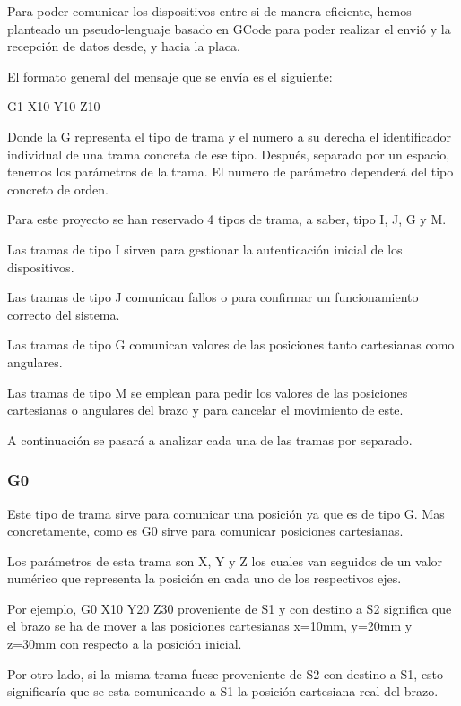 Para poder comunicar los dispositivos entre si de manera eficiente, hemos planteado un pseudo-lenguaje basado en GCode para poder realizar el envió y la recepción de datos desde, y hacia la placa.

El formato general del mensaje que se envía es el siguiente:

\begin{center}
\Big
    G1 X10 Y10 Z10
\end{center}

Donde la G representa el tipo de trama y el numero a su derecha el identificador individual de una trama concreta de ese tipo.
Después, separado por un espacio, tenemos los parámetros de la trama. El numero de parámetro dependerá del tipo concreto de orden.

Para este proyecto se han reservado 4 tipos de trama, a saber, tipo I, J, G y M.

Las tramas de tipo I sirven para gestionar la autenticación inicial de los dispositivos.

Las tramas de tipo J comunican fallos o para confirmar un funcionamiento correcto del sistema.

Las tramas de tipo G comunican valores de las posiciones tanto cartesianas como angulares.

Las tramas de tipo M se emplean para pedir los valores de las posiciones cartesianas o angulares del brazo y para cancelar el movimiento de este.

A continuación se pasará a analizar cada una de las tramas por separado.

\subsubsection{G0}
Este tipo de trama sirve para comunicar una posición ya que es de tipo G. Mas concretamente, como es G0 sirve para comunicar posiciones cartesianas.

Los parámetros de esta trama son X, Y y Z los cuales van seguidos de un valor numérico que representa la posición en cada uno de los respectivos ejes.

Por ejemplo, G0 X10 Y20 Z30 proveniente de \ac{S1} y con destino a \ac{S2} significa que el brazo se ha de mover a las posiciones cartesianas x=10mm, y=20mm y z=30mm con respecto a la posición inicial.

Por otro lado, si la misma trama fuese proveniente de \ac{S2} con destino a \ac{S1}, esto significaría que se esta comunicando a \ac{S1} la posición cartesiana real del brazo.

